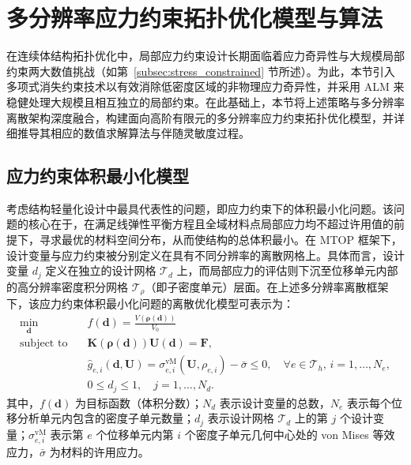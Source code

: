 \section{多分辨率应力约束拓扑优化模型与算法}
\label{sec:ch4_mtop_stress_constraint}

在连续体结构拓扑优化中，局部应力约束设计长期面临着应力奇异性与大规模局部约束两大数值挑战（如第~\ref{subsec:stress_constrained} 节所述）。为此，本节引入多项式消失约束技术以有效消除低密度区域的非物理应力奇异性，并采用 ALM 来稳健处理大规模且相互独立的局部约束。在此基础上，本节将上述策略与多分辨率离散架构深度融合，构建面向高阶有限元的多分辨率应力约束拓扑优化模型，并详细推导其相应的数值求解算法与伴随灵敏度过程。


\subsection{应力约束体积最小化模型}
\label{subsec:stress_constraint_model}

考虑结构轻量化设计中最具代表性的问题，即应力约束下的体积最小化问题。该问题的核心在于，在满足线弹性平衡方程且全域材料点局部应力均不超过许用值的前提下，寻求最优的材料空间分布，从而使结构的总体积最小。在 MTOP 框架下，设计变量与应力约束被分别定义在具有不同分辨率的离散网格上。具体而言，设计变量 $d_j$ 定义在独立的设计网格 $\mathcal{T}_d$ 上，而局部应力的评估则下沉至位移单元内部的高分辨率密度积分网格 $\mathcal{T}_\rho$（即子密度单元）层面。在上述多分辨率离散框架下，该应力约束体积最小化问题的离散优化模型可表示为：
\begin{equation} \label{eq:ch4_stress_mtop_model}
	\begin{aligned}
		\min_{\boldsymbol{d}} \quad & f(\boldsymbol{d}) = \frac{V(\boldsymbol{\rho}(\boldsymbol{d}))}{V_0} \\
		\text{subject to} \quad & \boldsymbol{K}(\boldsymbol{\rho}(\boldsymbol{d}))\boldsymbol{U}(\boldsymbol{d}) = \boldsymbol{F}, \\
		& \hat{g}_{e,i}(\boldsymbol{d}, \boldsymbol{U}) = \sigma_{e,i}^{\text{vM}}(\boldsymbol{U}, \rho_{e,i}) - \bar{\sigma} \le 0, \quad \forall e \in \mathcal{T}_h, \, i = 1, \dots, N_e, \\
		& 0 \le d_j \le 1, \quad j = 1, \dots, N_d.
	\end{aligned}
\end{equation}
其中，$f(\boldsymbol{d})$ 为目标函数（体积分数）；$N_d$ 表示设计变量的总数，$N_e$ 表示每个位移分析单元内包含的密度子单元数量；$d_j$ 表示设计网格 $\mathcal{T}_d$ 上的第 $j$ 个设计变量；$\sigma_{e,i}^{\text{vM}}$ 表示第 $e$ 个位移单元内第 $i$ 个密度子单元几何中心处的 von Mises 等效应力，$\bar{\sigma}$ 为材料的许用应力。

